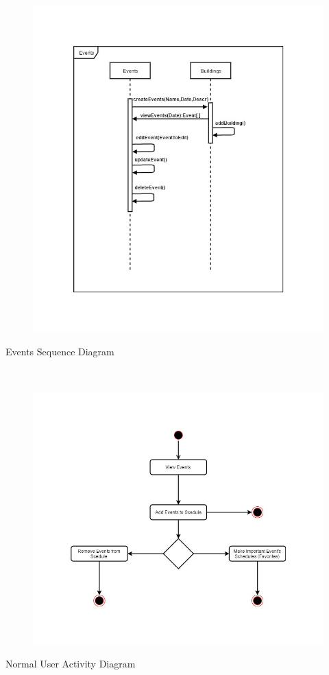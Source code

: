 \documentclass{article}
\begin{document}
    \begin{figure}[h!]
        \includegraphics[width=\textwidth]{Images/EventsSequence.jpg}
    \end{figure}
    Events Sequence Diagram
    
    \mbox{}\\
    \bigskip
    \clearpage
    
    \begin{figure}[h!]
        \includegraphics[width=\textwidth]{Images/ActivityDiagramUser.jpg}
    \end{figure}
    Normal User Activity Diagram
    
\end{document}
